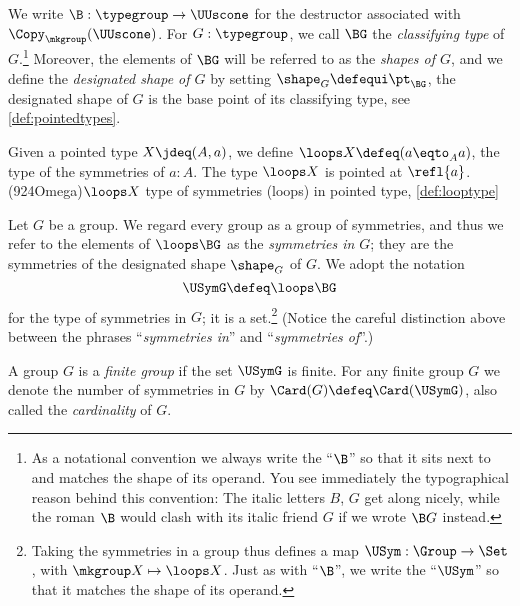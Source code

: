 \begin{definition}\label{def:classifying-type}
  We write $\B : \typegroup \to \UUscone$ for the
  destructor associated with $\Copy_{\mkgroup}(\UUscone)$.
  For $G : \typegroup$,
  we call $\BG$ the \emph{classifying type}
  of $G$.\footnote{%
    As a notational convention we always write the ``$\B$''
    so that it sits next to and matches the shape
    of its operand.
    You see immediately the typographical reason behind this convention:
    The italic letters $B$, $G$ get along nicely,
    while the roman $\B$ would clash with its italic friend $G$
    if we wrote $\B G$ instead.}
  Moreover, the elements of $\BG$ will be referred to as the \emph{shapes of $G$},
  and we define the \emph{designated shape of $G$}
  by setting
  $\shape_G\defequi \pt_{\BG}$,
  \ie the designated shape of $G$ is the base point of its
  classifying type, see \cref{def:pointedtypes}.
\end{definition}

\begin{definition}\label{def:looptype}
  Given a pointed type $X\jdeq(A,a)$, we define
  $\loops X \defeq (a \eqto_A a)$, \ie the type of the symmetries
  of $a:A$. %
  The type $\loops X$ is pointed at $\refl{a}$.%
  \glossary(924Omega){$\protect\loops X$}%
  {type of symmetries (loops) in pointed type, \cref{def:looptype}}
\end{definition}


\begin{definition}\label{def:group-symmetries}
  Let $G$ be a group.
  We regard every group as a group of symmetries,
  and thus we refer to the elements of $\loops \BG$ as the
  \emph{symmetries in $G$};
  they are the symmetries of the designated shape $\shape_G$ of $G$.
  We adopt the notation 
  \[
    \USymG \defeq \loops \BG
  \]
  for the type of symmetries in $G$; it is a set.\footnote{%
    Taking the symmetries in a group
    thus defines a map
    $\USym : \Group \to \Set$,
    with $\mkgroup X \mapsto \loops X$.
    Just as with ``$\B$'', we write the ``$\USym$'' so that it matches
    the shape of its operand.}
  (Notice the careful distinction above between the phrases
  ``\emph{symmetries in}'' and ``\emph{symmetries of}''.) 
\end{definition}

\begin{definition}\label{def:finite-group}
A group $G$ is a \emph{finite group} if the set $\USymG$ is finite.
For any finite group $G$ we denote the number of symmetries
in $G$ by $\Card(G)\defeq\Card(\USymG)$, also called the
\emph{cardinality} of $G$.
\end{definition}

